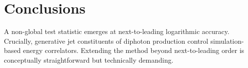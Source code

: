 \section{Conclusions}\label{sec:conclusions}

A non-global test statistic emerges at next-to-leading logarithmic
accuracy. Crucially, generative jet constituents of diphoton production
control simulation-based energy correlators. Extending the method beyond
next-to-leading order is conceptually straightforward but technically
demanding.

